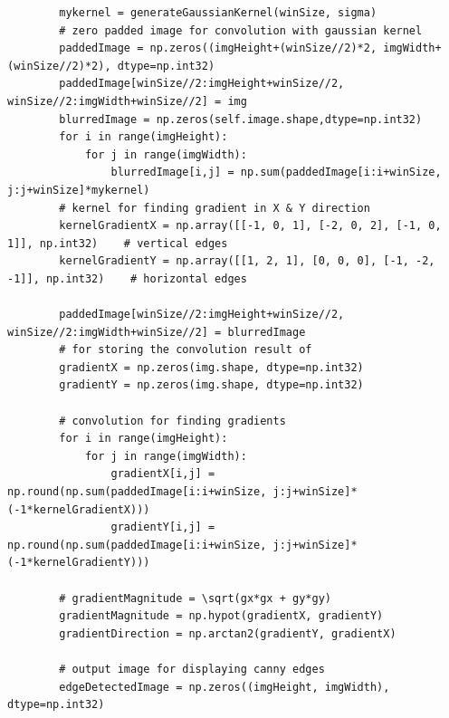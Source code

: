 \documentclass[letterpaper, 10 pt, conference]{ieeeconf}  %
\begin{document}
\begin{mdframed}
\begin{lstlisting}
        mykernel = generateGaussianKernel(winSize, sigma)
        # zero padded image for convolution with gaussian kernel
        paddedImage = np.zeros((imgHeight+(winSize//2)*2, imgWidth+(winSize//2)*2), dtype=np.int32)
        paddedImage[winSize//2:imgHeight+winSize//2, winSize//2:imgWidth+winSize//2] = img
        blurredImage = np.zeros(self.image.shape,dtype=np.int32)
        for i in range(imgHeight):
            for j in range(imgWidth):
                blurredImage[i,j] = np.sum(paddedImage[i:i+winSize, j:j+winSize]*mykernel)
        # kernel for finding gradient in X & Y direction
        kernelGradientX = np.array([[-1, 0, 1], [-2, 0, 2], [-1, 0, 1]], np.int32)    # vertical edges
        kernelGradientY = np.array([[1, 2, 1], [0, 0, 0], [-1, -2, -1]], np.int32)    # horizontal edges

        paddedImage[winSize//2:imgHeight+winSize//2, winSize//2:imgWidth+winSize//2] = blurredImage
        # for storing the convolution result of 
        gradientX = np.zeros(img.shape, dtype=np.int32)
        gradientY = np.zeros(img.shape, dtype=np.int32)

        # convolution for finding gradients
        for i in range(imgHeight):
            for j in range(imgWidth):
                gradientX[i,j] = np.round(np.sum(paddedImage[i:i+winSize, j:j+winSize]*(-1*kernelGradientX)))
                gradientY[i,j] = np.round(np.sum(paddedImage[i:i+winSize, j:j+winSize]*(-1*kernelGradientY)))

        # gradientMagnitude = \sqrt(gx*gx + gy*gy)
        gradientMagnitude = np.hypot(gradientX, gradientY)
        gradientDirection = np.arctan2(gradientY, gradientX)

        # output image for displaying canny edges
        edgeDetectedImage = np.zeros((imgHeight, imgWidth), dtype=np.int32)


\end{lstlisting}
\end{mdframed}
\end{document}
